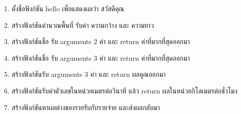 \begin{enumerate} 

\item ตั้งชื่อฟังก์ชัน hello เพื่อแสดงผลว่า สวัสดีคุณ
\item สร้างฟังก์ชันคำนวณพื้นที่ รับค่า ความกว้าง และ ความยาว
\item สร้างฟังก์ชันชื่อ   รับ arguments 2 ค่า และ return ค่าที่มากที่สุดออกมา
\item สร้างฟังก์ชันชื่อ   รับ arguments 3 ค่า และ return ค่าที่มากที่สุดออกมา
\item สร้างฟังก์ชันรับ arguments 3 ค่า และ return ผลคูณออกมา
\item สร้างฟังก์ชันรับค่าตัวเลขในหน่วยเมตรต่อวินาที แล้ว return ผลในหน่วยกิโลเมตรต่อชั่วโมง
\item สร้างฟังก์ชันหาผลต่างของรายรับกับรายจ่าย และส่งผลกลับมา

\end{enumerate}


